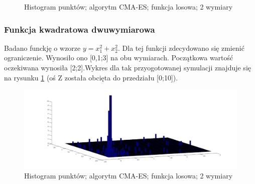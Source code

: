 \documentclass{mini}
\begin{document}
\begin{figure}[H]
\centering
{}
\quad
{}
\caption{Histogram punktów; algorytm CMA-ES; funkcja losowa; 2 wymiary}
\end{figure}

\subsubsection*{Funkcja kwadratowa dwuwymiarowa}
Badano funckję o wzorze $y=x_1^2+x_2^2$. Dla tej funkcji zdecydowano się zmienić ograniczenie. Wynosiło ono [0,1;3] na obu wymiarach. Początkowa wartość oczekiwana wynosiła [2;2].Wykres dla tak przyogotowanej symulacji znajduje się na rysunku \ref{cmaes:x2} (oś Z została obcięta do przedziału [0;10]).

\begin{figure}[H]
\centering
\includegraphics[width=\textwidth]{cmaes-x2dim2-boundaries-v2}
\caption{Histogram punktów; algorytm CMA-ES; funkcja losowa; 2 wymiary}
\label{cmaes:x2}
\end{figure}
\end{document}
